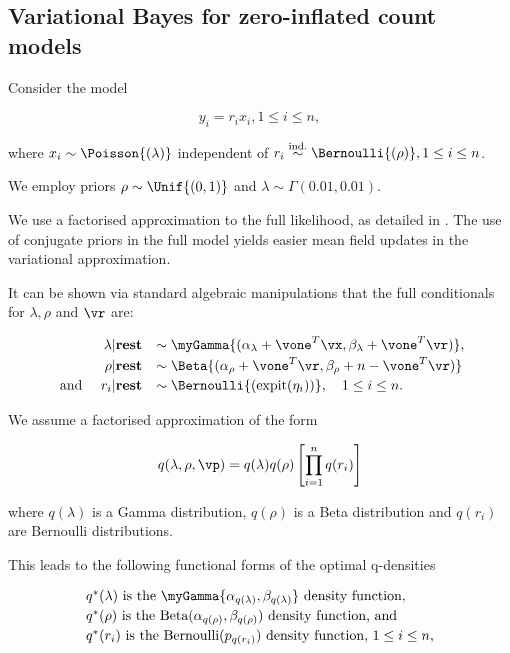 \subsection{Variational Bayes for zero-inflated count models}

\noindent Consider the model

$$
y_i = r_i x_i, 1 \leq i \leq n,
$$

\noindent where $x_i \sim \Poisson{(\lambda)}$ independent of
$r_i \stackrel{\text{ind.}}{\sim} \Bernoulli{(\rho)}, 1 \leq i \leq n$.

We employ priors $\rho \sim \Unif{(0, 1)}$ and $\lambda \sim \Gamma{(0.01, 0.01)}$. 
 

We use a factorised approximation to the full likelihood, as detailed in \citep{ormerod10}.
The use of conjugate priors in the full model yields easier mean field updates in the
variational approximation.

It can be shown via standard algebraic manipulations that the
full conditionals for $\lambda, \rho$ and $\vr$ are:

$$
\begin{array}{rl}
\lambda | \textbf{rest} &\sim \myGamma{(\alpha_\lambda + \vone^T\vx, \beta_\lambda + \vone^T\vr)}, \\ [0.5ex]
\rho | \textbf{rest} &\sim \Beta{(\alpha_\rho + \vone^T \vr, \beta_\rho + n - \vone^T\vr)} \\ [0.5ex]
\mbox{ and } \quad r_i | \textbf{rest} &\sim \Bernoulli{(\text{expit}(\eta_i))}, \quad 1 \leq i \leq n.
\end{array}
$$


\noindent We assume a factorised approximation of the form

$$
q(\lambda, \rho, \vp) = q(\lambda) q(\rho) \left [ \prod_{i=1}^n q(r_i) \right ]
$$

\noindent where $q(\lambda)$ is a Gamma distribution, $q(\rho)$ is a Beta distribution 
and $q(r_i)$ are Bernoulli distributions.

\noindent This leads to the following functional forms of the optimal q-densities

$$
\begin{array}{l}
\mbox{$q^*(\lambda)$ is the $\myGamma{\alpha_{q(\lambda)}, \beta_{q(\lambda)}}$ density function,} \\ [0.5ex]
\mbox{$q^*(\rho)$ is the $\text{Beta}(\alpha_{q(\rho)}, \beta_{q(\rho)})$ density function, and} \\ [0.5ex]
\mbox{$q^*(r_i)$  is the $\text{Bernoulli}(p_{q(r_i)})$ density function, $1 \leq i \leq n$,}
\end{array}
$$

